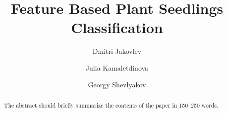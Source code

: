 \documentclass[runningheads]{llncs}
\begin{document}
%
\title{Feature Based Plant Seedlings Classification}
%
\author{Dmitri Jakovlev \and Julia Kamaletdinova \and Georgy Shevlyakov}
%
%

%
\maketitle              %
%
\begin{abstract}
The abstract should briefly summarize the contents of the paper in
150--250 words.

\end{abstract}
%
%
%









%
%



\end{document}
